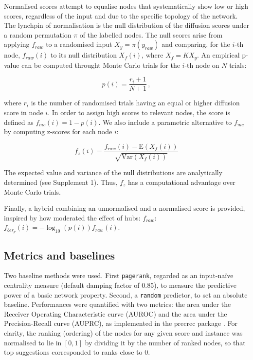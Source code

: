 \documentclass[final]{bioinfo}
\newcommand{\E}{\mathrm{E}}
\newcommand{\Var}{\mathrm{Var}}
\newcommand{\method}{\texttt}
\begin{document}
\begin{methods}
Normalised scores attempt to equalise nodes that systematically show low or high scores, regardless of the input and due to the specific topology of the network. 
The lynchpin of normalisation is the null distribution of the diffusion scores under a random permutation $\pi$ of the labelled nodes. 
The null scores arise from applying $f_{raw}$ to a randomised input $X_{y} = \pi (y_{raw})$ and comparing, for the $i$-th node, $f_{raw}(i)$ to its null distribution $X_f(i)$, where $X_f = K X_y $. 
An empirical p-value can be computed throught Monte Carlo trials for the $i$-th node on $N$ trials:

\begin{equation}\label{eq:empirical-p}
    p(i) = \frac{r_i + 1}{N + 1}\,,
\end{equation}

where $r_i$ is the number of randomised trials having an equal or higher diffusion score in node $i$.
In order to assign high scores to relevant nodes, the score is defined as $ f_{mc}(i) = 1 - p(i) $. 
We also include a parametric alternative to $f_{mc}$ by computing z-scores for each node $i$:

\begin{equation}\label{eq:f-z}
    f_z(i) = \frac{f_{raw}(i) - \E(X_f(i))}{\sqrt{\Var(X_f(i))}}
\end{equation}

The expected value and variance of the null distributions are analytically determined (see Supplement 1).
Thus, $f_z$ has a computational advantage over Monte Carlo trials. 

Finally, a hybrid combining an unnormalised and a normalised score is provided, inspired by how \citep{mosca} moderated the effect of hubs: $f_{raw}$: $f_{ber_p}(i) = -\log_{10}(p(i)) f_{raw}(i)$. 


\subsection*{Metrics and baselines}

Two baseline methods were used.
First \method{pagerank}, regarded as an input-na\"ive centrality measure (default damping factor of $0.85$), to measure the predictive power of a basic network property.
Second, a \method{random} predictor, to set an absolute baseline. 
Performances were quantified with two metrics: the area under the Receiver Operating Characteristic curve (AUROC) and the area under the Precision-Recall curve (AUPRC), as implemented in the precrec package \citep{precrec}.
For clarity, the ranking (ordering) of the nodes for any given score and instance was normalised to lie in $[0,1]$ by dividing it by the number of ranked nodes, so that top suggestions corresponded to ranks close to $0$.


\end{methods}
\end{document}
